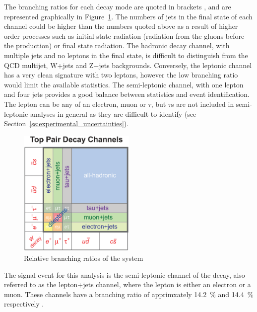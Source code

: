 The branching ratios for each decay mode are quoted in brackets \cite{Agashe:2014kda}, and are represented
graphically in Figure~\ref{fig:ttbar_branching_ratios}. The numbers of jets in the final state of each channel
could be higher than the numbers quoted above as a result of higher order processes such as initial state
radiation (radiation from the gluons before the \ttbar production) or final state radiation. The hadronic
decay channel, with multiple jets and no leptons in the final state, is difficult to distinguish from the QCD
multijet, W+jets and Z+jets backgrounds. Conversely, the leptonic channel has a very clean signature with two
leptons, however the low branching ratio would limit the available statistics. The semi-leptonic channel, with
one lepton and four jets provides a good balance between statistics and event identification. The lepton can
be any of an electron, muon or $\tau$, but $\tau$s are not included in semi-leptonic \tquark analyses in
general as they are difficult to identify (see Section~\ref{ss:experimental_uncertainties}).

\begin{figure}[hbtp]
   \centering
     \includegraphics[width=0.5\textwidth]{Chapters/03_Theory/Images/top_pair_decay_channels.eps}\hfill
     \caption[Relative branching ratios of the \ttbar system]{Relative branching ratios of the \ttbar system}
     \label{fig:ttbar_branching_ratios}
\end{figure}

The signal event for this analysis is the semi-leptonic channel of the \ttbar decay, also referred to as
the lepton+jets channel, where the lepton is either an electron or a muon. These channels have a branching
ratio of apprimxately 14.2~\% and 14.4~\% respectively \cite{Agashe:2014kda}.

